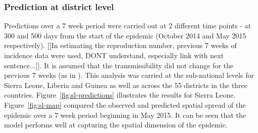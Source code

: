 \documentclass[11pt,]{article}
\begin{document}
\subsubsection{Prediction at district level}

Predictions over a 7 week period were carried out at 2 different time points - at 300 and
500 days from the start of the epidemic (October 2014 and May 2015
respectively). [[In estimating the reproduction number, previous 7 weeks
of incidence data were used, DONT understand, especially link with next sentence...]]. 
It is assumed that the 
transmissibility did not change for the previous 7 weeks (as in
\citep{team2015west}). This analysis was carried at the sub-national
levels for Sierra Leone, Liberia and
Guinea as well as across the 55 districts in the three countries.
Figure~\ref{fig:sl-predictions} illustrates the results for
Sierra Leone.  Figure~\ref{fig:sl-map} compared the observed and
predicted spatial spread of the epidemic over a 7 week period
beginning in May 2015. It can be seen that the model performs well at
capturing the spatial dimension of the epidemic.
\end{document}
